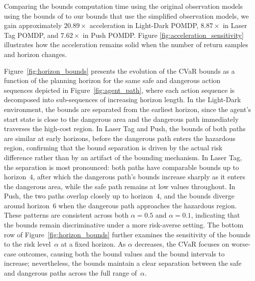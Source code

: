 \documentclass[acmlarge, manuscript, screen, review, natbib=false, oneside]{acmart}
\begin{document}
Comparing the bounds computation time using the original observation models using the bounds of \cite{pmlr-v97-thomas19a} to our bounds that use the simplified observation models, we gain approximately $20.89\times$ acceleration in Light-Dark POMDP, $8.87\times$ in Laser Tag POMDP, and $7.62\times$ in Push POMDP. Figure \ref{fig:acceleration_sensitivity} illustrates how the acceleration remains solid when the number of return samples and horizon changes.

Figure~\ref{fig:horizon_bounds} presents the evolution of the CVaR bounds as a function of the planning horizon for the same safe and dangerous action sequences depicted in Figure~\ref{fig:agent_path}, where each action sequence is decomposed into sub-sequences of increasing horizon length. In the Light-Dark environment, the bounds are separated from the earliest horizon, since the agent's start state is close to the dangerous area and the dangerous path immediately traverses the high-cost region. In Laser Tag and Push, the bounds of both paths are similar at early horizons, before the dangerous path enters the hazardous region, confirming that the bound separation is driven by the actual risk difference rather than by an artifact of the bounding mechanism. In Laser Tag, the separation is most pronounced: both paths have comparable bounds up to horizon~$4$, after which the dangerous path's bounds increase sharply as it enters the dangerous area, while the safe path remains at low values throughout. In Push, the two paths overlap closely up to horizon~$4$, and the bounds diverge around horizon~$6$ when the dangerous path approaches the hazardous region. These patterns are consistent across both $\alpha=0.5$ and $\alpha=0.1$, indicating that the bounds remain discriminative under a more risk-averse setting. The bottom row of Figure~\ref{fig:horizon_bounds} further examines the sensitivity of the bounds to the risk level~$\alpha$ at a fixed horizon. As $\alpha$ decreases, the CVaR focuses on worse-case outcomes, causing both the bound values and the bound intervals to increase; nevertheless, the bounds maintain a clear separation between the safe and dangerous paths across the full range of~$\alpha$.
\end{document}
